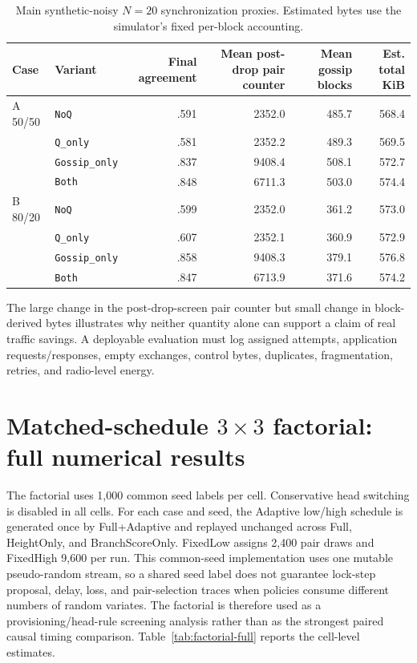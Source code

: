 \documentclass[11pt]{article}
\begin{document}
\begin{table}[H]
\centering
\caption{Main synthetic-noisy $N=20$ synchronization proxies. Estimated bytes use the simulator's fixed per-block accounting.}
\label{tab:synchronization-proxies}
\scriptsize
\begin{tabular}{llrrrr}
\toprule
Case & Variant & Final agreement & Mean post-drop pair counter & Mean gossip blocks & Est. total KiB\\
\midrule
A 50/50 & \texttt{NoQ} & .591 & 2352.0 & 485.7 & 568.4\\
& \texttt{Q\_only} & .581 & 2352.2 & 489.3 & 569.5\\
& \texttt{Gossip\_only} & .837 & 9408.4 & 508.1 & 572.7\\
& \texttt{Both} & .848 & 6711.3 & 503.0 & 574.4\\
\midrule
B 80/20 & \texttt{NoQ} & .599 & 2352.0 & 361.2 & 573.0\\
& \texttt{Q\_only} & .607 & 2352.1 & 360.9 & 572.9\\
& \texttt{Gossip\_only} & .858 & 9408.3 & 379.1 & 576.8\\
& \texttt{Both} & .847 & 6713.9 & 371.6 & 574.2\\
\bottomrule
\end{tabular}
\end{table}

The large change in the post-drop-screen pair counter but small change in block-derived bytes illustrates why neither quantity alone can support a claim of real traffic savings. A deployable evaluation must log assigned attempts, application requests/responses, empty exchanges, control bytes, duplicates, fragmentation, retries, and radio-level energy.

\section{Matched-schedule \texorpdfstring{$3\times3$}{3x3} factorial: full numerical results}
The factorial uses 1,000 common seed labels per cell. Conservative head switching is disabled in all cells. For each case and seed, the Adaptive low/high schedule is generated once by Full+Adaptive and replayed unchanged across Full, HeightOnly, and BranchScoreOnly. FixedLow assigns 2,400 pair draws and FixedHigh 9,600 per run. This common-seed implementation uses one mutable pseudo-random stream, so a shared seed label does not guarantee lock-step proposal, delay, loss, and pair-selection traces when policies consume different numbers of random variates. The factorial is therefore used as a provisioning/head-rule screening analysis rather than as the strongest paired causal timing comparison. Table~\ref{tab:factorial-full} reports the cell-level estimates.
\end{document}
